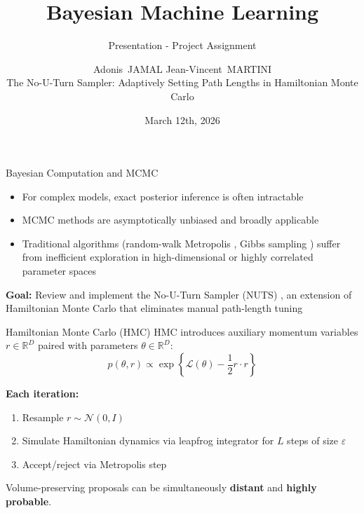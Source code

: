 \documentclass{beamer}
\title[BML]{Bayesian Machine Learning}
\subtitle{Presentation - Project Assignment}
\author[Jamal, Martini]{Adonis~JAMAL \quad Jean-Vincent~MARTINI\\The No-U-Turn Sampler: Adaptively Setting Path Lengths in Hamiltonian Monte Carlo}
\institute[ENS Paris-Saclay]{Ecole Normale Supérieure Paris-Saclay - MVA 2025-2026}
\date[March 12th 2026]{March 12th, 2026}
\begin{document}
\frame{\titlepage}



\begin{frame}{Bayesian Computation and MCMC}
    \begin{itemize}
        \item For complex models, exact posterior inference is often intractable
        \item MCMC methods are asymptotically unbiased and broadly applicable \cite{neal1993probabilistic}
        \item Traditional algorithms (random-walk Metropolis \cite{metropolis1953equation}, Gibbs sampling \cite{geman1984stochastic}) suffer from inefficient exploration in high-dimensional or highly correlated parameter spaces
    \end{itemize}

    \vspace{0.3cm}
    \textbf{Goal:} Review and implement the No-U-Turn Sampler (NUTS) \cite{main}, an extension of Hamiltonian Monte Carlo that eliminates manual path-length tuning
\end{frame}

\begin{frame}{Hamiltonian Monte Carlo (HMC)}
    HMC \cite{neal2011mcmc, duane1987hybrid} introduces auxiliary momentum variables $r \in \mathbb{R}^D$ paired with parameters $\theta \in \mathbb{R}^D$:
    \[
        p(\theta, r) \propto \exp\left\{\mathcal{L}(\theta) - \frac{1}{2} r \cdot r\right\}
    \]

    \vspace{0.2cm}
    \textbf{Each iteration:}
    \begin{enumerate}
        \item Resample $r \sim \mathcal{N}(0, I)$
        \item Simulate Hamiltonian dynamics via leapfrog integrator for $L$ steps of size $\varepsilon$
        \item Accept/reject via Metropolis step
    \end{enumerate}

    \vspace{0.2cm}
    Volume-preserving proposals can be simultaneously \textbf{distant} and \textbf{highly probable}.
\end{frame}
\end{document}
